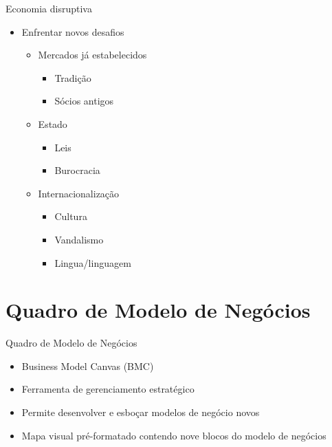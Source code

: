 \documentclass[t]{beamer}
\begin{document}
\begin{frame}{Economia disruptiva}
	\begin{itemize}
		\item Enfrentar novos desafios
		\begin{itemize}
			\item Mercados já estabelecidos
			\begin{itemize}
				\item Tradição
				\item Sócios antigos
			\end{itemize}
			\item Estado
			\begin{itemize}
				\item Leis
				\item Burocracia
			\end{itemize}
			\item Internacionalização
			\begin{itemize}
				\item Cultura
				\item Vandalismo
				\item Lingua/linguagem
			\end{itemize}
		\end{itemize}
	\end{itemize}
\end{frame}

\section{Quadro de Modelo de Negócios}

\begin{frame}{Quadro de Modelo de Negócios}
	\begin{itemize}
		\item Business Model Canvas (BMC)
		\item Ferramenta de gerenciamento estratégico
		\item Permite desenvolver e esboçar modelos de negócio novos
		\item Mapa visual pré-formatado contendo nove blocos do modelo de negócios
	\end{itemize}
\end{frame}
\end{document}
